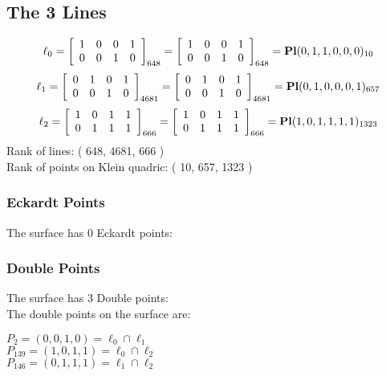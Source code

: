 \documentclass{article}
\begin{document}
{\subsection*{The 3 Lines}
$$
\ell_{0} = 
\left[
\begin{array}{*{4}{r}}
1 & 0 & 0 & 1\\
0 & 0 & 1 & 0\\
\end{array}
\right]
_{648}
=
\left[
\begin{array}{*{4}c}
1  & 0  & 0  & 1\\
0  & 0  & 1  & 0\\
\end{array}
\right]_{648}
={\rm\bf Pl}(0,1,1,0,0,0 )_{10}$$
$$
\ell_{1} = 
\left[
\begin{array}{*{4}{r}}
0 & 1 & 0 & 1\\
0 & 0 & 1 & 0\\
\end{array}
\right]
_{4681}
=
\left[
\begin{array}{*{4}c}
0  & 1  & 0  & 1\\
0  & 0  & 1  & 0\\
\end{array}
\right]_{4681}
={\rm\bf Pl}(0,1,0,0,0,1 )_{657}$$
$$
\ell_{2} = 
\left[
\begin{array}{*{4}{r}}
1 & 0 & 1 & 1\\
0 & 1 & 1 & 1\\
\end{array}
\right]
_{666}
=
\left[
\begin{array}{*{4}c}
1  & 0  & 1  & 1\\
0  & 1  & 1  & 1\\
\end{array}
\right]_{666}
={\rm\bf Pl}(1,0,1,1,1,1 )_{1323}$$
Rank of lines: ( 648, 4681, 666 )\\
Rank of points on Klein quadric: ( 10, 657, 1323 )\\
\subsubsection*{Eckardt Points}
The surface has 0 Eckardt points:\\
\subsubsection*{Double Points}
The surface has 3 Double points:\\
The double points on the surface are:\\
\begin{multicols}{2}
\noindent
$P_{2} = ( 0, 0, 1, 0 ) = \ell_{0} \cap \ell_{1} $\\
$P_{139} = ( 1, 0, 1, 1 ) = \ell_{0} \cap \ell_{2} $\\
$P_{146} = ( 0, 1, 1, 1 ) = \ell_{1} \cap \ell_{2} $\\
\end{multicols}
}
\end{document}
